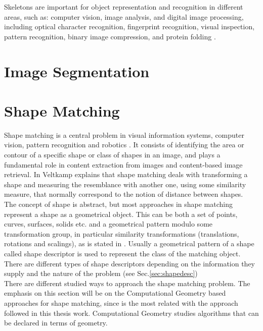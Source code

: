 Skeletons are important for object representation and recognition in different areas,
such as: computer vision, image analysis, and digital image processing, 
including optical character recognition, fingerprint recognition, visual inspection,
pattern recognition, binary image compression, and protein folding \cite{skprotein}.


\section{Image Segmentation}
\label{sec:segmentation}


\section{Shape Matching}
\label{sec:shapefitting}

Shape matching is a central problem in visual information systems,
computer vision, pattern recognition and robotics \cite{matchingbook}. 
It consists of identifying the area or contour of a specific
shape or class of shapes in an image, and plays a fundamental
role in content extraction from images and content-based image
retrieval. In \cite{matching2} Veltkamp explains that shape 
matching deals with transforming a shape and measuring the 
resemblance with another one, using some similarity measure, that 
normally correspond to the notion of distance between shapes.\\
The concept of shape is abstract, but most approaches in 
shape matching represent a shape as a geometrical object.
This can be both a set of points, curves, surfaces, solids etc.
and a geometrical pattern modulo some transformation group,
in particular similarity transformations (translations, rotations 
and scalings), as is stated in \cite{matching2}. Usually a
geometrical pattern of a shape called shape descriptor
is used to represent the class of the matching object. There are
different types of shape descriptors depending on the information
they supply and the nature of the problem (see Sec.\ref{sec:shapedesc}) \\

There are different studied ways to approach the shape matching 
problem. The emphasis on this section will be on the Computational
Geometry based approaches for shape matching, since is the most related with
the approach followed in this thesis work. Computational
Geometry studies algorithms that can be declared in terms of 
geometry.\\

